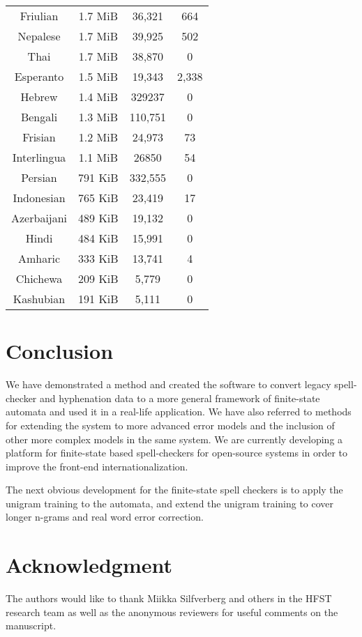 \documentclass[a4paper,conference]{IEEEtran}
\begin{document}
\begin{table}[tbp]
\begin{tabular}{c|c|c|c}
    Friulian & 1.7 MiB & 36,321 & 664 \\
    Nepalese & 1.7 MiB & 39,925 & 502 \\
    Thai & 1.7 MiB & 38,870 & 0 \\
    Esperanto & 1.5 MiB & 19,343 & 2,338 \\
    Hebrew & 1.4 MiB & 329237 & 0 \\
    Bengali & 1.3 MiB & 110,751 & 0 \\
    Frisian& 1.2 MiB & 24,973 & 73 \\
    Interlingua & 1.1 MiB & 26850 & 54 \\
    Persian & 791 KiB & 332,555 & 0 \\
    Indonesian & 765 KiB & 23,419 & 17 \\
    Azerbaijani & 489 KiB & 19,132 & 0 \\
    Hindi & 484 KiB & 15,991 & 0 \\
    Amharic & 333 KiB & 13,741 & 4 \\
    Chichewa & 209 KiB & 5,779 & 0 \\
    Kashubian & 191 KiB & 5,111 & 0 \\
    \hline
  \end{tabular}
\end{table}

\section{Conclusion}

We have demonstrated a method and created the software to convert legacy
spell-checker and hyphenation data to a more general framework of
finite-state automata and used it in a real-life application. We have
also referred to methods for extending the system to more advanced
error models and the inclusion of other more complex models in the
same system. We are currently developing a platform for finite-state
based spell-checkers for open-source systems in order to improve the
front-end internationalization.

The next obvious development for the finite-state spell checkers is to
apply the unigram training \cite{conf/lrec/Pirinen2010} to the automata,
and extend the unigram training to cover longer n-grams and real word
error correction.


\section*{Acknowledgment}

The authors would like to thank Miikka Silfverberg and others in the
HFST research team as well as the anonymous reviewers for useful comments on the
manuscript.




\end{document}
